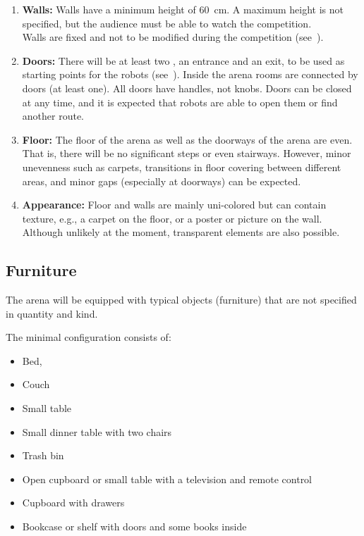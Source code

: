 \begin{enumerate}
	\item \textbf{Walls:} Walls have a minimum height of \SI{60}{\centi\meter}. A maximum height is not specified, but the audience must be able to watch the competition.\\
	Walls are fixed and not to be modified during the competition (see~).

	\item \textbf{Doors:} There will be at least two , an entrance and an exit, to be used as starting points for the robots (see~).
	Inside the arena rooms are connected by doors (at least one).
	All doors have handles, not knobs.
	Doors can be closed at any time, and it is expected that robots are able to open them or find another route.

	\item \textbf{Floor:} The floor of the arena as well as the doorways of the arena are even.
	That is, there will be no significant steps or even stairways.
	However, minor unevenness such as carpets, transitions in floor covering between different areas, and minor gaps (especially at doorways) can be expected.

	\item \textbf{Appearance:} Floor and walls are mainly uni-colored but can contain texture, e.g., a carpet on the floor, or a poster or picture on the wall.\\
	Although unlikely at the moment, transparent elements are also possible.
\end{enumerate}


\subsection{Furniture}
\label{rule:scenario_furniture}
The arena will be equipped with typical objects (furniture) that are not specified in quantity and kind.

The minimal configuration consists of:
\begin{itemize}
	\item Bed,
	\item Couch
	\item Small table
	\item Small dinner table with two chairs
	\item Trash bin
	\item Open cupboard or small table with a television and remote control
	\item Cupboard with drawers
	\item Bookcase or shelf with doors and some books inside
\end{itemize}

